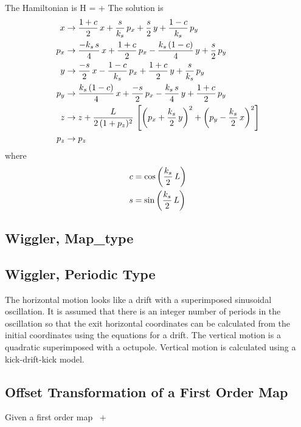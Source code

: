 \documentclass{book}
\begin{document}
The Hamiltonian is
\Begineq
  H =  + 
\Endeq
The solution is
\begin{align}
  x   &\rightarrow \frac{1 + c}{2} \, x + \frac{s}{k_s} \, p_x +
           \frac{s}{2} \, y + \frac{1 - c}{k_s} \, p_y \nonumber \\
  p_x &\rightarrow \frac{-k_s \, s}{4} \, x + \frac{1 + c}{2} \, p_x - 
           \frac{k_s \, (1 - c)}{4} \, y + \frac{s}{2} \, p_y \nonumber \\
  y   &\rightarrow \frac{-s}{2} \, x - \frac{1 - c}{k_s} \, p_x +
           \frac{1 + c}{2} \, y + \frac{s}{k_s} \, p_y \\      
  p_y &\rightarrow \frac{k_s \, (1 - c)}{4} \, x + \frac{-s}{2} \, p_x -
            \frac{k_s \, s}{4} \, y + \frac{1 + c}{2} \, p_y \nonumber \\ 
  z   &\rightarrow z + \frac{L}{2 \, (1 + p_z)^2} \, 
                   \left[ \left( p_x + \frac{k_s}{2} \, y \right)^2 +
                          \left( p_y - \frac{k_s}{2} \, x \right)^2 \right] \nonumber \\
  p_z &\rightarrow p_z \nonumber
\end{align}
where
\begin{align}
  c &= \cos \left( \frac{k_s}{2} \, L \right) \nonumber \\
  s &= \sin \left( \frac{k_s}{2} \, L \right)
\end{align}

\subsection{Wiggler, Map\_type}



\subsection{Wiggler, Periodic Type}

The horizontal motion looks like a drift with a superimposed
sinusoidal oscillation. It is assumed that there is an integer number
of periods in the oscillation so that the exit horizontal coordinates
can be calculated from the initial coordinates using the equations for
a drift. The vertical motion is a quadratic superimposed with a
octupole. Vertical motion is calculated using a kick-drift-kick model.

\subsection{Offset Transformation of a First Order Map}

Given a first order map
\Begineq
  \bfr \rightarrow \bfr \, \bfM + \bfK
\Endeq
\end{document}
